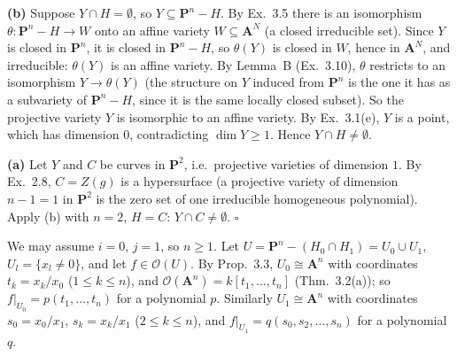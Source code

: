 \documentclass[11pt]{article}
\begin{document}
\pf
\textbf{(b)} Suppose $Y\cap H=\emptyset$, so $Y\subseteq\mathbf P^n-H$. By Ex.~3.5 there is an isomorphism $\theta:\mathbf P^n-H\to W$ onto an affine variety $W\subseteq\mathbf A^N$ (a closed irreducible set). Since $Y$ is closed in $\mathbf P^n$, it is closed in $\mathbf P^n-H$, so $\theta(Y)$ is closed in $W$, hence in $\mathbf A^N$, and irreducible: $\theta(Y)$ is an affine variety. By Lemma~B (Ex.~3.10), $\theta$ restricts to an isomorphism $Y\to\theta(Y)$ (the structure on $Y$ induced from $\mathbf P^n$ is the one it has as a subvariety of $\mathbf P^n-H$, since it is the same locally closed subset). So the projective variety $Y$ is isomorphic to an affine variety. By Ex.~3.1(e), $Y$ is a point, which has dimension $0$, contradicting $\dim Y\ge1$. Hence $Y\cap H\neq\emptyset$.

\textbf{(a)} Let $Y$ and $C$ be curves in $\mathbf P^2$, i.e.\ projective varieties of dimension $1$. By Ex.~2.8, $C=Z(g)$ is a hypersurface (a projective variety of dimension $n-1=1$ in $\mathbf P^2$ is the zero set of one irreducible homogeneous polynomial). Apply (b) with $n=2$, $H=C$: $Y\cap C\neq\emptyset$. \hfill$\square$


\pf
We may assume $i=0$, $j=1$, so $n\ge1$. Let $U=\mathbf P^n-(H_0\cap H_1)=U_0\cup U_1$, $U_l=\{x_l\ne0\}$, and let $f\in\mathcal O(U)$. By Prop.~3.3, $U_0\cong\mathbf A^n$ with coordinates $t_k=x_k/x_0$ ($1\le k\le n$), and $\mathcal O(\mathbf A^n)=k[t_1,\dots,t_n]$ (Thm.~3.2(a)); so $f|_{U_0}=p(t_1,\dots,t_n)$ for a polynomial $p$. Similarly $U_1\cong\mathbf A^n$ with coordinates $s_0=x_0/x_1$, $s_k=x_k/x_1$ ($2\le k\le n$), and $f|_{U_1}=q(s_0,s_2,\dots,s_n)$ for a polynomial $q$.
\end{document}
